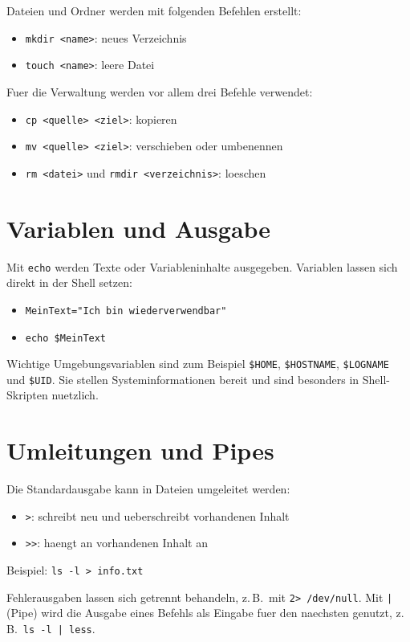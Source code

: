 \documentclass[11pt, oneside, numbers=noenddot]{scrbook}
\begin{document}
Dateien und Ordner werden mit folgenden Befehlen erstellt:
\begin{itemize}
\item \texttt{mkdir <name>}: neues Verzeichnis
\item \texttt{touch <name>}: leere Datei
\end{itemize}

Fuer die Verwaltung werden vor allem drei Befehle verwendet:
\begin{itemize}
\item \texttt{cp <quelle> <ziel>}: kopieren
\item \texttt{mv <quelle> <ziel>}: verschieben oder umbenennen
\item \texttt{rm <datei>} und \texttt{rmdir <verzeichnis>}: loeschen
\end{itemize}

\section{Variablen und Ausgabe}
Mit \texttt{echo} werden Texte oder Variableninhalte ausgegeben. Variablen lassen sich direkt in der Shell setzen:
\begin{itemize}
\item \texttt{MeinText="Ich bin wiederverwendbar"}
\item \texttt{echo \$MeinText}
\end{itemize}

Wichtige Umgebungsvariablen sind zum Beispiel \texttt{\$HOME}, \texttt{\$HOSTNAME}, \texttt{\$LOGNAME} und \texttt{\$UID}. Sie stellen Systeminformationen bereit und sind besonders in Shell-Skripten nuetzlich.

\section{Umleitungen und Pipes}
Die Standardausgabe kann in Dateien umgeleitet werden:
\begin{itemize}
\item \texttt{>}: schreibt neu und ueberschreibt vorhandenen Inhalt
\item \texttt{>>}: haengt an vorhandenen Inhalt an
\end{itemize}

Beispiel: \texttt{ls -l > info.txt}

Fehlerausgaben lassen sich getrennt behandeln, z.\,B.\ mit \texttt{2> /dev/null}. Mit \texttt{|} (Pipe) wird die Ausgabe eines Befehls als Eingabe fuer den naechsten genutzt, z.\,B.\ \texttt{ls -l | less}.
\end{document}
